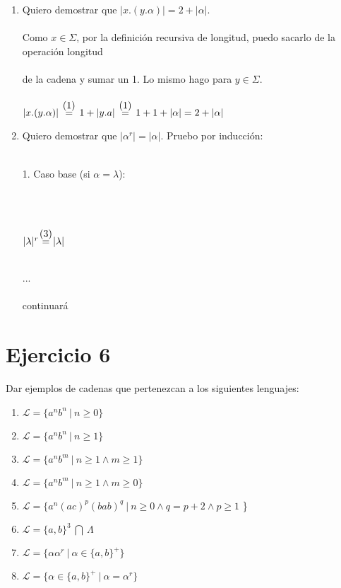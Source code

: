 \documentclass{article}
\begin{document}
{{\begin{enumerate}[label=\alph*.,font=\itshape]
    \item {Quiero demostrar que $|x.(y.\alpha)| = 2 + |\alpha|$.
    \\
    \\
    {Como $x \in \Sigma$, por la definición recursiva de longitud, puedo sacarlo de la operación longitud \\ \\ de la cadena y sumar un 1. Lo mismo hago para $y \in \Sigma$.}
    \\
    \\
$|x.(y.\alpha)| \ \ {\stackrel{\mathclap{\normalfont\mbox{(1)}}}{=}} \ \ 1 + |y.a| \ \ {\stackrel{\mathclap{\normalfont\mbox{(1)}}}{=}} \ \ 1 + 1 + |\alpha| = 2 + |\alpha|$}
    \\ 
    \item {Quiero demostrar que $|\alpha^r|=|\alpha|$. Pruebo por inducción: \\ \\
    \centerline{1. Caso base (si $\alpha = \lambda$):}
    \\
    \\
    \centerline{$|\lambda|^r{ \ \stackrel{\mathclap{\normalfont\mbox{(3)}}}{=}} \ |\lambda|$}
    \\
    ...
    \\
    \\
    continuará}
\end{enumerate}

\section*{Ejercicio 6}{Dar ejemplos de cadenas que pertenezcan a los siguientes lenguajes:}
\begin{enumerate}[label=\alph*.,font=\itshape]
    \item {$\mathcal{L} = \{a^nb^n \ | \ n \geq 0\}$}
    \item {$\mathcal{L} = \{a^nb^n \ | \ n \geq 1\}$}
    \item {$\mathcal{L} = \{a^nb^m \ | \ n \geq 1 \land m \geq 1\}$}
    \item {$\mathcal{L} = \{a^nb^m \ | \ n \geq 1 \land m \geq 0\}$}
    \item {$ \mathcal{L} = \{ a^n(ac)^p(bab)^q \ | \ n \geq 0 \land q = p + 2 \land p \geq 1$ \}}
    \item {$\mathcal{L} = \{ a, b \}^3 \ \bigcap \ \Lambda $}
    \item {$\mathcal{L} = \{ \alpha\alpha^r \ | \ \alpha \in \{ a,b \} ^+\}$}
    \item {$\mathcal{L} = \{ \alpha \in \{ a,b \} ^+ \ | \ \alpha = \alpha^r \}$ \\ \\}
\end{enumerate}

}}
\end{document}
